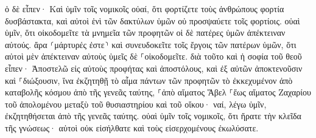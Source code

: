 \documentclass{openreader}
\begin{document}
ὁ δὲ εἶπεν· Καὶ ὑμῖν τοῖς νομικοῖς οὐαί, ὅτι φορτίζετε τοὺς ἀνθρώπους φορτία δυσβάστακτα, καὶ αὐτοὶ ἑνὶ τῶν δακτύλων ὑμῶν οὐ προσψαύετε τοῖς φορτίοις. 
οὐαὶ ὑμῖν, ὅτι οἰκοδομεῖτε τὰ μνημεῖα τῶν προφητῶν οἱ δὲ πατέρες ὑμῶν ἀπέκτειναν αὐτούς. 
ἄρα ⸂μάρτυρές ἐστε⸃ καὶ συνευδοκεῖτε τοῖς ἔργοις τῶν πατέρων ὑμῶν, ὅτι αὐτοὶ μὲν ἀπέκτειναν αὐτοὺς ὑμεῖς δὲ ⸀οἰκοδομεῖτε. 
διὰ τοῦτο καὶ ἡ σοφία τοῦ θεοῦ εἶπεν· Ἀποστελῶ εἰς αὐτοὺς προφήτας καὶ ἀποστόλους, καὶ ἐξ αὐτῶν ἀποκτενοῦσιν καὶ ⸀διώξουσιν, 
ἵνα ἐκζητηθῇ τὸ αἷμα πάντων τῶν προφητῶν τὸ ἐκκεχυμένον ἀπὸ καταβολῆς κόσμου ἀπὸ τῆς γενεᾶς ταύτης, 
⸀ἀπὸ αἵματος Ἅβελ ⸀ἕως αἵματος Ζαχαρίου τοῦ ἀπολομένου μεταξὺ τοῦ θυσιαστηρίου καὶ τοῦ οἴκου· ναί, λέγω ὑμῖν, ἐκζητηθήσεται ἀπὸ τῆς γενεᾶς ταύτης. 
οὐαὶ ὑμῖν τοῖς νομικοῖς, ὅτι ἤρατε τὴν κλεῖδα τῆς γνώσεως· αὐτοὶ οὐκ εἰσήλθατε καὶ τοὺς εἰσερχομένους ἐκωλύσατε. 
\end{document}
